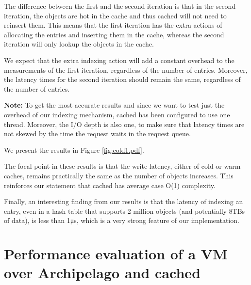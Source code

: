 The difference between the first and the second iteration is that in the second 
iteration, the objects are hot in the cache and thus cached will not need to 
reinsert them. This means that the first iteration has the extra actions of 
allocating the entries and inserting them in the cache, whereas the second 
iteration will only lookup the objects in the cache.

We expect that the extra indexing action will add a constant overhead to the 
measurements of the first iteration, regardless of the number of entries.
Moreover, the latency times for the second iteration should remain the same, 
regardless of the number of entries.

\textbf{Note:} To get the most accurate results and since we want to test just 
the overhead of our indexing mechanism, cached has been configured to use one 
thread.  Moreover, the I/O depth is also one, to make sure that latency times 
are not skewed by the time the request waits in the request queue.

We present the results in Figure \ref{fig:cold1.pdf}.


The focal point in these results is that the write latency, either of cold or 
warm caches, remains practically the same as the number of objects increases.  
This reinforces our statement that cached has average case O(1) complexity.

Finally, an interesting finding from our results is that the latency of 
indexing an entry, even in a hash table that supports 2 million objects (and 
potentially 8TBs of data), is less than 1μs, which is a very strong feature of 
our implementation.

\begin{comment}
As a side note, we observe a constant decrease in writelatency as the number of 
objects increase this is not something that should be attributed to our 
implementation. (explain that we have used a hash table that holds 2million 
objects, so it is not mapped to our process's address space. When more objects 
are indexed, the hash table becomes fuller and the latency of mmap()s is 
equally distributed to the objects. Else, the hash table is more scarce but the 
same blocks are hit, albeit not fully written, and thus the mmap latency is the 
same but distributed to less objects.)
\end{comment}

\section{Performance evaluation of a VM over Archipelago and cached}
\label{sec:vm-plot}

